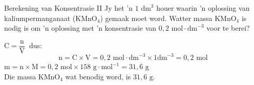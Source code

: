     \noindent
\par


      \begin{wex}{Berekening van Konsentrasie II }
{
Jy het  'n $1 {\text{ dm}}^{3}$ houer waarin 'n oplossing van kaliumpermanganaat ($\text{KMnO}{}_{4}$) gemaak moet word. Watter massa $\text{KMnO}{}_{4}$ is nodig is om  'n oplossing met 'n konsentrasie van $0,2 \text{ mol}\cdot \text{dm}^{-3}$ voor te berei? 
     }
{
$\text{C}=\dfrac{\text{n}}{\text{V}}~$ dus:
      \label{m38712*id283321}\nopagebreak\noindent{}        
    \begin{equation*}
    \text{n}=\text{C}\ensuremath{\times}\text{V}=0,2 \text{ mol} \cdot \text{dm}^{-3} \times 1 \text{dm}^{-3} = 0,2 \text{ mol}
      \end{equation*}
$\text{m}=\text{n} \times \text{M} = 0,2 \text{ mol} \times 158 \text{ g} \cdot \text{mol}^{-1} = 31,6 \text{ g}$\\
Die massa $\text{KMnO}{}_{4}$ wat benodig word, is $31,6 \text{ g}$.
 
}
    \end{wex}
    \noindent
\label{m38712*secfhsst!!!underscore!!!id1795} 

